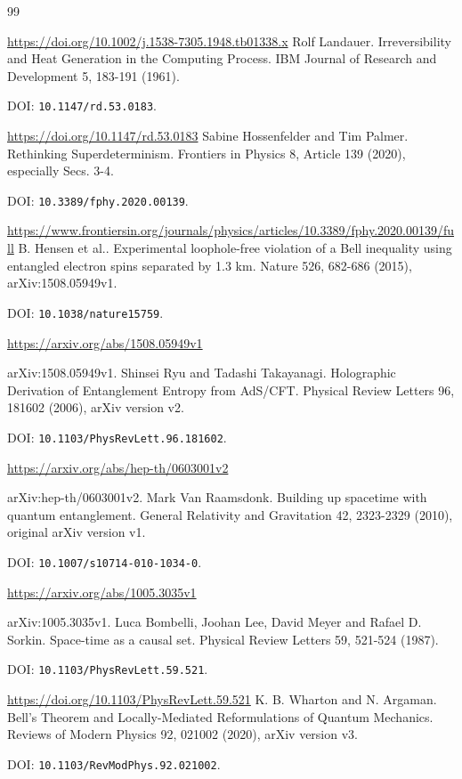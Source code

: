 \begin{thebibliography}{99}
\par\url{https://doi.org/10.1002/j.1538-7305.1948.tb01338.x}
Rolf Landauer. Irreversibility and Heat Generation in the Computing Process. IBM Journal of Research and Development 5, 183-191 (1961).
\par DOI: \nolinkurl{10.1147/rd.53.0183}.
\par\url{https://doi.org/10.1147/rd.53.0183}
Sabine Hossenfelder and Tim Palmer. Rethinking Superdeterminism. Frontiers in Physics 8, Article 139 (2020), especially Secs. 3-4.
\par DOI: \nolinkurl{10.3389/fphy.2020.00139}.
\par\url{https://www.frontiersin.org/journals/physics/articles/10.3389/fphy.2020.00139/full}
B. Hensen et al.. Experimental loophole-free violation of a Bell inequality using entangled electron spins separated by 1.3 km. Nature 526, 682-686 (2015), arXiv:1508.05949v1.
\par DOI: \nolinkurl{10.1038/nature15759}.
\par\url{https://arxiv.org/abs/1508.05949v1}
\par arXiv:1508.05949v1.
Shinsei Ryu and Tadashi Takayanagi. Holographic Derivation of Entanglement Entropy from AdS/CFT. Physical Review Letters 96, 181602 (2006), arXiv version v2.
\par DOI: \nolinkurl{10.1103/PhysRevLett.96.181602}.
\par\url{https://arxiv.org/abs/hep-th/0603001v2}
\par arXiv:hep-th/0603001v2.
Mark Van Raamsdonk. Building up spacetime with quantum entanglement. General Relativity and Gravitation 42, 2323-2329 (2010), original arXiv version v1.
\par DOI: \nolinkurl{10.1007/s10714-010-1034-0}.
\par\url{https://arxiv.org/abs/1005.3035v1}
\par arXiv:1005.3035v1.
Luca Bombelli, Joohan Lee, David Meyer and Rafael D. Sorkin. Space-time as a causal set. Physical Review Letters 59, 521-524 (1987).
\par DOI: \nolinkurl{10.1103/PhysRevLett.59.521}.
\par\url{https://doi.org/10.1103/PhysRevLett.59.521}
K. B. Wharton and N. Argaman. Bell's Theorem and Locally-Mediated Reformulations of Quantum Mechanics. Reviews of Modern Physics 92, 021002 (2020), arXiv version v3.
\par DOI: \nolinkurl{10.1103/RevModPhys.92.021002}.

\end{thebibliography}
